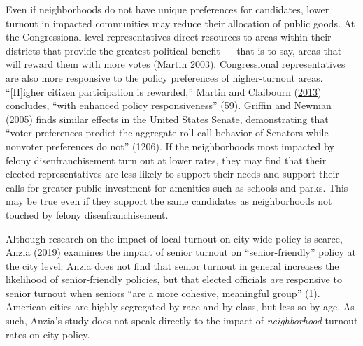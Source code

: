 \documentclass[12pt,]{article}
\begin{document}
Even if neighborhoods do not have unique preferences for candidates, lower turnout in impacted communities may reduce their allocation of public goods. At the Congressional level representatives direct resources to areas within their districts that provide the greatest political benefit --- that is to say, areas that will reward them with more votes (Martin \protect\hyperlink{ref-Martin2003}{2003}). Congressional representatives are also more responsive to the policy preferences of higher-turnout areas. ``{[}H{]}igher citizen participation is rewarded,'' Martin and Claibourn (\protect\hyperlink{ref-Martin2013}{2013}) concludes, ``with enhanced policy responsiveness'' (59). Griffin and Newman (\protect\hyperlink{ref-Griffin2005}{2005}) finds similar effects in the United States Senate, demonstrating that ``voter preferences predict the aggregate roll-call behavior of Senators while nonvoter preferences do not'' (1206). If the neighborhoods most impacted by felony disenfranchisement turn out at lower rates, they may find that their elected representatives are less likely to support their needs and support their calls for greater public investment for amenities such as schools and parks. This may be true even if they support the same candidates as neighborhoods not touched by felony disenfranchisement.

Although research on the impact of local turnout on city-wide policy is scarce, Anzia (\protect\hyperlink{ref-Anzia2019}{2019}) examines the impact of senior turnout on ``senior-friendly'' policy at the city level. Anzia does not find that senior turnout in general increases the likelihood of senior-friendly policies, but that elected officials \emph{are} responsive to senior turnout when seniors ``are a more cohesive, meaningful group'' (1). American cities are highly segregated by race and by class, but less so by age. As such, Anzia's study does not speak directly to the impact of \emph{neighborhood} turnout rates on city policy.
\end{document}
